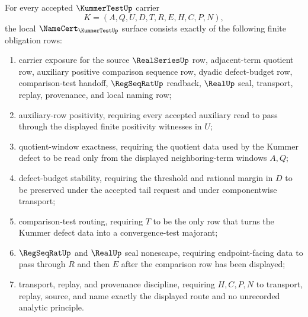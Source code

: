 \begin{theorem}\label{thm:kummer-test-namecert-obligations}
For every accepted $\KummerTestUp$ carrier
$$
K=(A,Q,U,D,T,R,E,H,C,P,N),
$$
the local $\NameCert_{\KummerTestUp}$ surface consists exactly of the following finite obligation rows:
\begin{enumerate}
\item carrier exposure for the source $\RealSeriesUp$ row, adjacent-term quotient row, auxiliary positive comparison sequence row, dyadic defect-budget row, comparison-test handoff, $\RegSeqRatUp$ readback, $\RealUp$ seal, transport, replay, provenance, and local naming row;
\item auxiliary-row positivity, requiring every accepted auxiliary read to pass through the displayed finite positivity witnesses in $U$;
\item quotient-window exactness, requiring the quotient data used by the Kummer defect to be read only from the displayed neighboring-term windows $A,Q$;
\item defect-budget stability, requiring the threshold and rational margin in $D$ to be preserved under the accepted tail request and under componentwise transport;
\item comparison-test routing, requiring $T$ to be the only row that turns the Kummer defect data into a convergence-test majorant;
\item $\RegSeqRatUp$ and $\RealUp$ seal nonescape, requiring endpoint-facing data to pass through $R$ and then $E$ after the comparison row has been displayed;
\item transport, replay, and provenance discipline, requiring $H,C,P,N$ to transport, replay, source, and name exactly the displayed route and no unrecorded analytic principle.
\end{enumerate}
\end{theorem}
